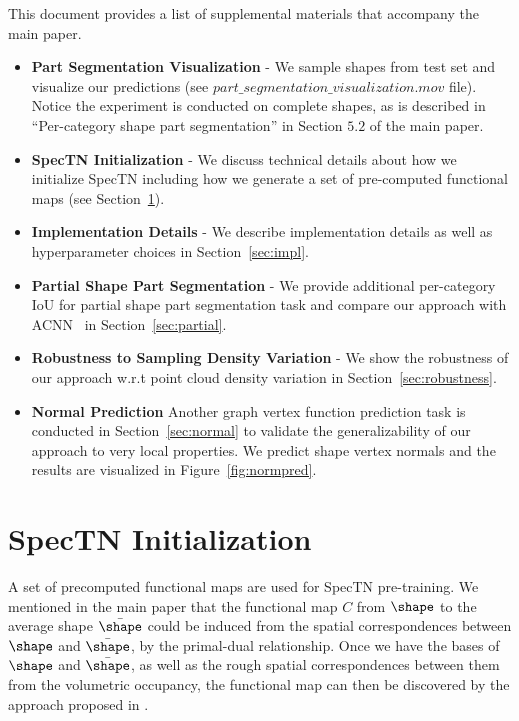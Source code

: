 \appendix
This document provides a list of supplemental materials that accompany the main paper.
\begin{itemize}
    \item \textbf{Part Segmentation Visualization} - We sample shapes from test set and visualize our predictions (see $part\_segmentation\_visualization.mov$ file). Notice the experiment is conducted on complete shapes, as is described in ``Per-category shape part segmentation'' in Section $5.2$ of the main paper.
    \item \textbf{SpecTN Initialization} - We discuss technical details about how we initialize SpecTN including how we generate a set of pre-computed functional maps (see Section~\ref{sec:init}).
    \item \textbf{Implementation Details} - We describe implementation details as well as hyperparameter choices in Section~\ref{sec:impl}.
    \item \textbf{Partial Shape Part Segmentation} - We provide additional per-category IoU for partial shape part segmentation task and compare our approach with ACNN~\cite{boscaini2016learning} in Section~\ref{sec:partial}.
    \item \textbf{Robustness to Sampling Density Variation} - We show the robustness of our approach w.r.t point cloud density variation in Section~\ref{sec:robustness}.
    \item \textbf{Normal Prediction} Another graph vertex function prediction task is conducted in Section~\ref{sec:normal} to validate the generalizability of our approach to very local properties. We predict shape vertex normals and the results are visualized in Figure~\ref{fig:normpred}.
\end{itemize}

\section{SpecTN Initialization}
\label{sec:init}
A set of precomputed functional maps are used for SpecTN pre-training. We mentioned in the main paper that the functional map $C$ from $\shape$ to the average shape $\bar{\shape}$ could be induced from the spatial correspondences between $\shape$ and $\bar{\shape}$, by the primal-dual relationship. Once we have the bases of $\shape$ and $\bar{\shape}$, as well as the rough spatial correspondences between them from the volumetric occupancy, the functional map can then be discovered by the approach proposed in \cite{ovsjanikov2012functional}. 

